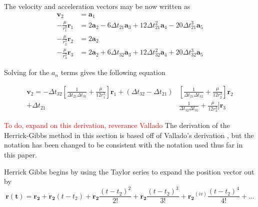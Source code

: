 \documentclass[12pt]{article}
\begin{document}
	The velocity and acceleration vectors may be now written as
	 \begin{equation}
	 \begin{aligned} \mathbf { v } _ { 2 } & = \mathbf { a } _ { 1 } \\ - \frac { \mu } { r _ { 1 } ^ { 3 } } \mathbf { r } _ { 1 } & = 2 \mathbf { a } _ { 2 } - 6 \Delta t _ { 21 } \mathbf { a } _ { 3 } + 12 \Delta t _ { 21 } ^ { 2 } \mathbf { a } _ { 4 } - 20 \Delta t _ { 21 } ^ { 3 } \mathbf { a } _ { 5 } \\ - \frac { \mu } { r _ { 2 } ^ { 3 } } \mathbf { r } _ { 2 } & = 2 \mathbf { a } _ { 2 } \\ - \frac { \mu } { r _ { 3 } ^ { 3 } } \mathbf { r } _ { 3 } & = 2 \mathbf { a } _ { 2 } + 6 \Delta t _ { 32 } \mathbf { a } _ { 3 } + 12 \Delta t _ { 32 } ^ { 2 } \mathbf { a } _ { 4 } + 20 \Delta t _ { 32 } ^ { 3 } \mathbf { a } _ { 5 } \end{aligned}
	 \end{equation}
	
	Solving for the $a_n$ terms gives the following equation
	
	\begin{equation}
	\begin{aligned} \mathbf { v } _ { 2 } = - \Delta t _ { 32 } \left[ \frac { 1 } { \Delta t _ { 21 } \Delta t _ { 31 } } + \frac { \mu } { 12 r _ { 1 } ^ { 3 } } \right] \mathbf { r } _ { 1 } + \left( \Delta t _ { 32 } - \Delta t _ { 21 } \right) & \left[ \frac { 1 } { \Delta t _ { 21 } \Delta t _ { 32 } } + \frac { \mu } { 12 r _ { 2 } ^ { 3 } } \right] \mathbf { r } _ { 2 } \\ + \Delta t _ { 21 } & \frac { 1 } { \Delta t _ { 32 } \Delta t _ { 31 } } + \frac { \mu } { 12 r _ { 3 } ^ { 3 } } ] \mathbf { r } _ { 3 } \end{aligned}
	\end{equation}
	
	\textcolor{red}{To do, expand on this derivation, reverance Vallado}
	\iffalse
	The derivation of the Herrick-Gibbs method in this section is based off of Vallado's derivation \cite{vallado2007fundamentals}, but the notation has been changed to be consistent with the notation used thus far in this paper. 
	
		Herrick Gibbs begins by using the Taylor series to expand the position vector out by 
		\begin{equation}
		\mathbf{r(t)}=\mathbf{r_2}+\mathbf{\dot{r}_2} (t-t_2) + \mathbf{\ddot{r}_2} \frac{(t-t_2)^2}{2!}+ \mathbf{\dddot{r}_2} \frac{(t-t_2)^3}{3!}+ \mathbf{{r_2}}^{(iv)} \frac{(t-t_2)^4}{4!}+\dots
		\end{equation}
		
\end{document}

